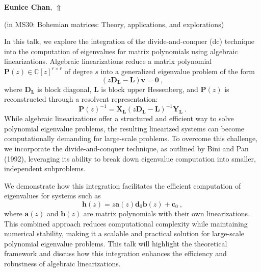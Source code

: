 \documentclass[ILAS2025-program.tex]{subfiles}
\begin{document}
\hypertarget{down0231}{}\begin{ilasabstract}
    
\textbf{Eunice Chan},  \hfill \hyperlink{up0231}{$\Uparrow$}
    
    
(in {\color{mstitle}MS30: Bohemian matrices: Theory, applications, and explorations})
        
\mtskip
    In this talk, we explore the integration of the divide-and-conquer (dc) technique into the computation of eigenvalues for matrix polynomials using algebraic linearizations. Algebraic linearizations reduce a matrix polynomial $\mathbf{P}(z) \in \mathbb{C}[z]^{r \times r}$ of degree $s$ into a generalized eigenvalue problem of the form
\begin{equation*}
    (z\mathbf{D_L} - \mathbf{L})\mathbf{v} = \mathbf{0} \>,
\end{equation*}
where $\mathbf{D_L}$ is block diagonal, $\mathbf{L}$ is block upper Hessenberg, and $\mathbf{P}(z)$ is reconstructed through a resolvent representation:
\begin{equation*}
    \mathbf{P}(z)^{-1} = \mathbf{X_L}(z\mathbf{D_L} - \mathbf{L})^{-1}\mathbf{Y_L} \>.
\end{equation*}
While algebraic linearizations offer a structured and efficient way to solve polynomial eigenvalue problems, the resulting linearized systems can become computationally demanding for large-scale problems. To overcome this challenge, we incorporate the divide-and-conquer technique, as outlined by Bini and Pan (1992), leveraging its ability to break down eigenvalue computation into smaller, independent subproblems.

We demonstrate how this integration facilitates the efficient computation of eigenvalues for systems such as
\begin{equation*}
    \mathbf{h}(z) = z\mathbf{a}(z)\mathbf{d}_0\mathbf{b}(z) + \mathbf{c}_0 \>,
\end{equation*}
where $\mathbf{a}(z)$ and $\mathbf{b}(z)$ are matrix polynomials with their own linearizations. This combined approach reduces computational complexity while maintaining numerical stability, making it a scalable and practical solution for large-scale polynomial eigenvalue problems. This talk will highlight the theoretical framework and discuss how this integration enhances the efficiency and robustness of algebraic linearizations.


\end{ilasabstract}
    
\end{document}
